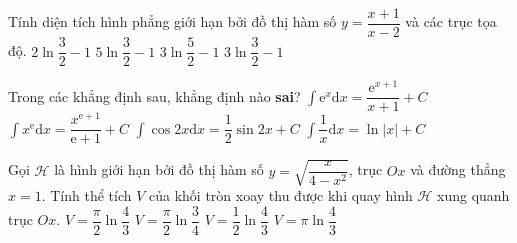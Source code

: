 \begin{ex}%
Tính diện tích hình phẳng giới hạn bởi đồ thị hàm số $ y=\dfrac{x+1}{x-2} $ và các trục tọa độ.
	\choice
	{$ 2\ln\dfrac{3}{2}-1 $}
	{$ 5\ln\dfrac{3}{2}-1 $}
	{$ 3\ln\dfrac{5}{2}-1 $}
	{\True $ 3\ln\dfrac{3}{2}-1 $}
\end{ex}
\begin{ex}%
	Trong các khẳng định sau, khẳng định nào \textbf{sai}?
	\choice
	{\True $ \displaystyle\int\mathrm{e}^{x}\mathrm{d}x=\dfrac{\mathrm{e}^{x+1}}{x+1}+C $}
	{$ \displaystyle\int x^{\mathrm{e}}\mathrm{d}x=\dfrac{x^{\mathrm{e}+1}}{\mathrm{e}+1}+C $}
	{$ \displaystyle\int \cos 2x\mathrm{d}x=\dfrac{1}{2}\sin 2x+C $}
	{$ \displaystyle\int \dfrac{1}{x}\mathrm{d}x=\ln|x|+C $}
\end{ex}
\begin{ex}%
	Gọi $ \mathscr{H} $ là hình giới hạn bởi đồ thị hàm số $ y=\sqrt{\dfrac{x}{4-x^{2}}} $, trục $ Ox $ và đường thẳng $ x=1 $. Tính thể tích $ V $ của khối tròn xoay thu được khi quay hình $ \mathscr{H} $ xung quanh trục $ Ox $.
	\choice
	{\True $ V=\dfrac{\pi}{2}\ln\dfrac{4}{3} $}
	{$ V=\dfrac{\pi}{2}\ln\dfrac{3}{4} $}
	{$ V=\dfrac{1}{2}\ln\dfrac{4}{3} $}
	{$ V=\pi\ln\dfrac{4}{3} $}
\end{ex}
